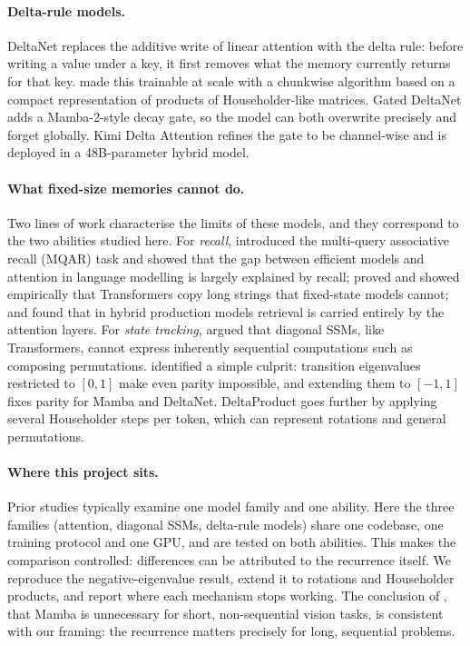 \paragraph{Delta-rule models.} DeltaNet replaces the additive write of linear attention with the delta
rule: before writing a value under a key, it first removes what the memory currently returns for that
key. \citet{yang2024deltanet} made this trainable at scale with a chunkwise algorithm based on a compact
representation of products of Householder-like matrices. Gated DeltaNet \citep{yang2025gated} adds a
Mamba-2-style decay gate, so the model can both overwrite precisely and forget globally. Kimi Delta
Attention \citep{kimi2025linear} refines the gate to be channel-wise and is deployed in a 48B-parameter
hybrid model.

\paragraph{What fixed-size memories cannot do.} Two lines of work characterise the limits of these
models, and they correspond to the two abilities studied here. For \emph{recall}, \citet{arora2024zoology}
introduced the multi-query associative recall (MQAR) task and showed that the gap between efficient models
and attention in language modelling is largely explained by recall; \citet{jelassi2024repeat} proved and
showed empirically that Transformers copy long strings that fixed-state models cannot; and
\citet{michalak2025some} found that in hybrid production models retrieval is carried entirely by the
attention layers. For \emph{state tracking}, \citet{merrill2024illusion} argued that diagonal SSMs, like
Transformers, cannot express inherently sequential computations such as composing permutations.
\citet{grazzi2025unlocking} identified a simple culprit: transition eigenvalues restricted to $[0,1]$ make
even parity impossible, and extending them to $[-1,1]$ fixes parity for Mamba and DeltaNet. DeltaProduct
\citep{siems2025deltaproduct} goes further by applying several Householder steps per token, which can
represent rotations and general permutations.

\paragraph{Where this project sits.} Prior studies typically examine one model family and one ability.
Here the three families (attention, diagonal SSMs, delta-rule models) share one codebase, one training
protocol and one GPU, and are tested on both abilities. This makes the comparison controlled: differences
can be attributed to the recurrence itself. We reproduce the negative-eigenvalue result, extend it to
rotations and Householder products, and report where each mechanism stops working. The conclusion
of \citet{yu2025mambaout}, that Mamba is unnecessary for short, non-sequential vision tasks, is consistent
with our framing: the recurrence matters precisely for long, sequential problems.
